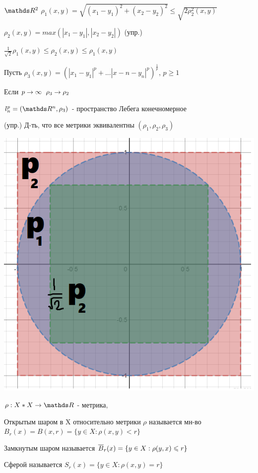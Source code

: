 \documentclass[main]{subfiles}
\begin{document}
  \begin{example}
      $\R^2$ $\rho_1(x,y) = \sqrt{(x_1-y_1)^2 + (x_2-y_2)^2} \leqslant \sqrt{2 \rho_2^2(x,y)}$

      $\rho_2(x,y)=max(|x_1-y_1|, |x_2-y_2|)$ (упр.)

      $\frac{1}{\sqrt{2}} \rho_1(x,y) \leqslant \rho_2(x,y) \leqslant \rho_1(x,y)$

      Пусть $\rho_3(x,y)=(|x_1-y_1|^p+...|x-n-y_n|^p)^{\frac{1}{p}}$, $p \geqslant 1$

      Если $p \rightarrow \infty$ $\rho_3 \rightarrow \rho_2$

      $l_n^p=(\R^n,\rho_3)$ - пространство Лебега конечномерное

      (упр.) Д-ть, что все метрики эквивалентны $(\rho_1,\rho_2,\rho_3)$

      \includegraphics[scale=0.3]{pics/p1p2p3.png}
  \end{example}

  \begin{definition}
      $\rho: X*X \ra \R$ - метрика,

      Открытым шаром в X относительно метрики $\rho$ называется мн-во $B_r(x)=B(x,r)=\{y \in X: \rho(x,y) < r \}$

      Замкнутым шаром называется $\overline{B}_r(x)=\{y \in X: \rho(y,x) \leqslant r \}$

      Сферой называется $S_r(x)=\{y \in X: \rho(x,y)=r \}$
  \end{definition}
\end{document}
